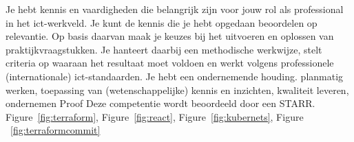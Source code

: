 \competentie
{%
	\competentieformulier
	{%
		Je hebt kennis en vaardigheden die belangrijk zijn voor
		jouw rol als professional in het ict-werkveld. Je kunt de
		kennis die je hebt opgedaan beoordelen op relevantie.
		Op basis daarvan maak je keuzes bij het uitvoeren en
		oplossen van praktijkvraagstukken. Je hanteert daarbij
		een methodische werkwijze, stelt criteria op waaraan
		het resultaat moet voldoen en werkt volgens
		professionele (internationale) ict-standaarden.
		Je hebt een ondernemende houding.
	}
	{%
		planmatig werken,
		toepassing van (wetenschappelijke) kennis en inzichten,
		kwaliteit leveren,
		ondernemen
	}
	{%
		Proof
	}
	{%
		Deze competentie wordt beoordeeld door een STARR.
	}
	{%
		Figure~\ref{fig:terraform},
		Figure~\ref{fig:react},
		Figure~\ref{fig:kubernets},
		Figure ~\ref{fig:terraformcommit}
	}
}
